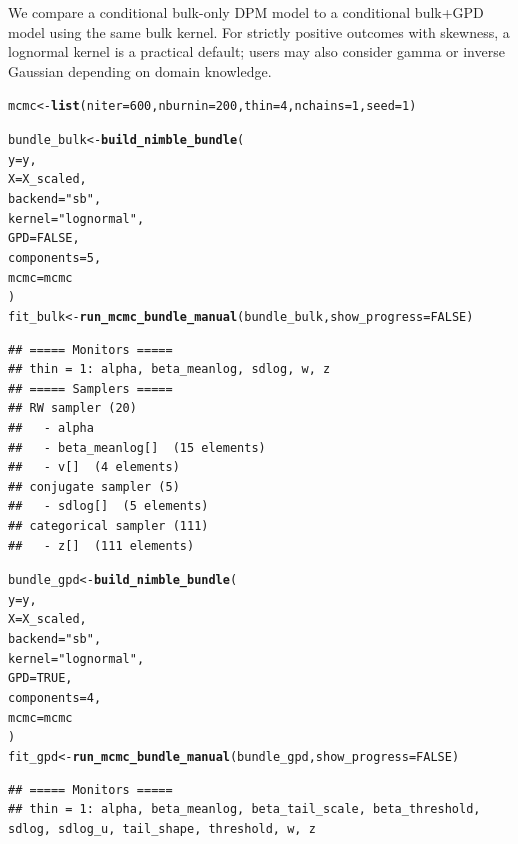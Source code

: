 \documentclass[article]{jss}\usepackage[]{graphicx}\usepackage[]{xcolor}
\makeatletter
\newcommand{\hlnum}[1]{\textcolor[rgb]{0.686,0.059,0.569}{#1}}%
\newcommand{\hlsng}[1]{\textcolor[rgb]{0.192,0.494,0.8}{#1}}%
\newcommand{\hldef}[1]{\textcolor[rgb]{0.345,0.345,0.345}{#1}}%
\newcommand{\hlkwb}[1]{\textcolor[rgb]{0.69,0.353,0.396}{#1}}%
\newcommand{\hlkwc}[1]{\textcolor[rgb]{0.333,0.667,0.333}{#1}}%
\newcommand{\hlkwd}[1]{\textcolor[rgb]{0.737,0.353,0.396}{\textbf{#1}}}%
\newenvironment{kframe}{%
 \def\at@end@of@kframe{}%
 \ifinner\ifhmode%
  \def\at@end@of@kframe{\end{minipage}}%
  \begin{minipage}{\columnwidth}%
 \fi\fi%
 \def\FrameCommand##1{\hskip\@totalleftmargin \hskip-\fboxsep
 \colorbox{shadecolor}{##1}\hskip-\fboxsep
     \hskip-\linewidth \hskip-\@totalleftmargin \hskip\columnwidth}%
 \MakeFramed {\advance\hsize-\width
   \@totalleftmargin\z@ \linewidth\hsize
   \@setminipage}}%
 {\par\unskip\endMakeFramed%
 \at@end@of@kframe}
\newenvironment{knitrout}{}{} %
\makeatother
\begin{document}
We compare a conditional bulk-only DPM model to a conditional bulk+GPD model using the same bulk kernel.
For strictly positive outcomes with skewness, a lognormal kernel is a practical default;
users may also consider gamma or inverse Gaussian depending on domain knowledge.

\begin{knitrout}
\color{fgcolor}\begin{kframe}
\begin{alltt}
\hldef{mcmc} \hlkwb{<-} \hlkwd{list}\hldef{(}\hlkwc{niter} \hldef{=} \hlnum{600}\hldef{,} \hlkwc{nburnin} \hldef{=} \hlnum{200}\hldef{,} \hlkwc{thin} \hldef{=} \hlnum{4}\hldef{,} \hlkwc{nchains} \hldef{=} \hlnum{1}\hldef{,} \hlkwc{seed} \hldef{=} \hlnum{1}\hldef{)}

\hldef{bundle_bulk} \hlkwb{<-} \hlkwd{build_nimble_bundle}\hldef{(}
  \hlkwc{y} \hldef{= y,}
  \hlkwc{X} \hldef{= X_scaled,}
  \hlkwc{backend} \hldef{=} \hlsng{"sb"}\hldef{,}
  \hlkwc{kernel} \hldef{=} \hlsng{"lognormal"}\hldef{,}
  \hlkwc{GPD} \hldef{=} \hlnum{FALSE}\hldef{,}
  \hlkwc{components} \hldef{=} \hlnum{5}\hldef{,}
  \hlkwc{mcmc} \hldef{= mcmc}
\hldef{)}
\hldef{fit_bulk} \hlkwb{<-} \hlkwd{run_mcmc_bundle_manual}\hldef{(bundle_bulk,} \hlkwc{show_progress} \hldef{=} \hlnum{FALSE}\hldef{)}
\end{alltt}
\begin{verbatim}
## ===== Monitors =====
## thin = 1: alpha, beta_meanlog, sdlog, w, z
## ===== Samplers =====
## RW sampler (20)
##   - alpha
##   - beta_meanlog[]  (15 elements)
##   - v[]  (4 elements)
## conjugate sampler (5)
##   - sdlog[]  (5 elements)
## categorical sampler (111)
##   - z[]  (111 elements)
\end{verbatim}
\begin{alltt}
\hldef{bundle_gpd} \hlkwb{<-} \hlkwd{build_nimble_bundle}\hldef{(}
  \hlkwc{y} \hldef{= y,}
  \hlkwc{X} \hldef{= X_scaled,}
  \hlkwc{backend} \hldef{=} \hlsng{"sb"}\hldef{,}
  \hlkwc{kernel} \hldef{=} \hlsng{"lognormal"}\hldef{,}
  \hlkwc{GPD} \hldef{=} \hlnum{TRUE}\hldef{,}
  \hlkwc{components} \hldef{=} \hlnum{4}\hldef{,}
  \hlkwc{mcmc} \hldef{= mcmc}
\hldef{)}
\hldef{fit_gpd} \hlkwb{<-} \hlkwd{run_mcmc_bundle_manual}\hldef{(bundle_gpd,} \hlkwc{show_progress} \hldef{=} \hlnum{FALSE}\hldef{)}
\end{alltt}
\begin{verbatim}
## ===== Monitors =====
## thin = 1: alpha, beta_meanlog, beta_tail_scale, beta_threshold, sdlog, sdlog_u, tail_shape, threshold, w, z

\end{verbatim}
\end{kframe}
\end{knitrout}
\end{document}
